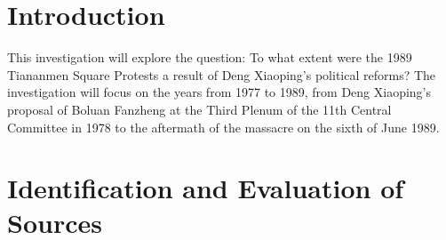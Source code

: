 \documentclass{paper}
\begin{document}
\insertTitlePage

\section*{Introduction}
\begin{doublespace}
This investigation will explore the question: To what extent were the 1989 Tiananmen Square Protests a result of Deng Xiaoping's political reforms? The investigation will focus on the years from 1977 to 1989, from Deng Xiaoping's proposal of Boluan Fanzheng at the Third Plenum of the 11th Central Committee in 1978 to the aftermath of the massacre on the sixth of June 1989.
\end{doublespace}

\section{Identification and Evaluation of Sources}
\begin{doublespace}


\end{doublespace}
\end{document}
